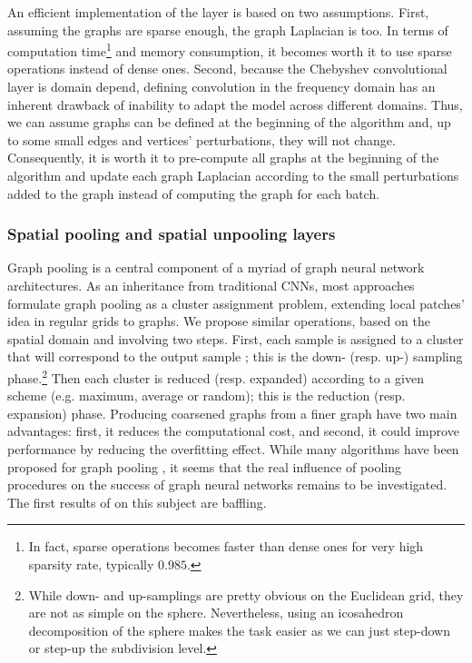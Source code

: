 \documentclass{article}
\begin{document}
An efficient implementation of the layer is based on two assumptions. First, assuming the graphs are sparse enough, the graph Laplacian is too. In terms of computation time\footnote{In fact, sparse operations becomes faster than dense ones for very high sparsity rate, typically $0.985$.} and memory consumption, it becomes worth it to use sparse operations instead of dense ones. Second, because the Chebyshev convolutional layer is domain depend, defining convolution in the frequency domain has an inherent drawback of inability to adapt the model across different domains. Thus, we can assume graphs can be defined at the beginning of the algorithm and, up to some small edges and vertices' perturbations, they will not change. Consequently, it is worth it to pre-compute all graphs at the beginning of the algorithm and update each graph Laplacian according to the small perturbations added to the graph instead of computing the graph for each batch.


\subsubsection{Spatial pooling and spatial unpooling layers}

Graph pooling is a central component of a myriad of graph neural network architectures. As an inheritance from traditional CNNs, most approaches formulate graph pooling as a cluster assignment problem, extending local patches' idea in regular grids to graphs. We propose similar operations, based on the spatial domain and involving two steps. First, each sample is assigned to a cluster that will correspond to the output sample  ; this is the down- (resp. up-) sampling phase.\footnote{While down- and up-samplings are pretty obvious on the Euclidean grid, they are not as simple on the sphere. Nevertheless, using an icosahedron decomposition of the sphere makes the task easier as we can just step-down or step-up the subdivision level.} Then each cluster is reduced (resp. expanded) according to a given scheme (e.g. maximum, average or random); this is the reduction (resp. expansion) phase. Producing coarsened graphs from a finer graph have two main advantages: first, it reduces the computational cost, and second, it could improve performance by reducing the overfitting effect. While many algorithms have been proposed for graph pooling \citep{dhillon2007weighted, ying2018hierarchical, khasahmadi2020memory}, it seems that the real influence of pooling procedures on the success of graph neural networks remains to be investigated. The first results of  \cite{mesquita2020rethinking} on this subject are baffling. 
\end{document}

